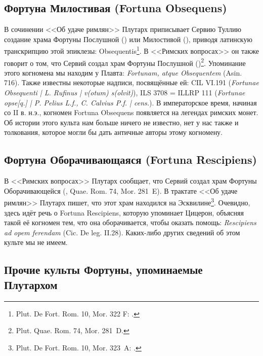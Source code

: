\subsection{Фортуна Милостивая (Fortuna Obsequens)}\label{FortunaObsequens}

В сочинении <<Об удаче римлян>> Плутарх приписывает Сервию Туллию создание храма Фортуны Послушной () или Милостивой (), приводя латинскую транскрипцию этой эпиклезы: Obsequentis\footnote{Plut. De Fort. Rom. 10, Mor. 322 F: .}. В <<Римских вопросах>> он также говорит о том, что Сервий создал храм Фортуны Послушной ()\footnote{Plut. Quae. Rom. 74, Mor. 281~D.}. Упоминание этого когномена мы находим у Плавта: \textit{Fortunam, atque Obsequentem} (Asin. 716). Также известны некоторые надписи, посвящённые ей: CIL VI.191 (\textit{Fortunae Obsequenti |  L. Rufinus | v(otum) s(olvit)}), ILS 3708 = ILLRP 111 (\textit{Fortunae opse[q.] | P. Pelius L.f., C. Calvius P.f. | cens.}). В императорское время, начиная со II в. н.э., когномен Fortuna Obsequens появляется на легендах римских монет. Об истории этого культа нам больше ничего не известно, нет у нас также и толкования, которое могли бы дать античные авторы этому когномену.

\subsection{Фортуна Оборачивающаяся (Fortuna Rescipiens)}\label{FortunaRescipiens}

В <<Римских вопросах>> Плутарх сообщает, что Сервий создал храм Фортуны Оборачивающейся (, Quae. Rom. 74, Mor. 281~E). В трактате <<Об удаче римлян>> Плутарх пишет, что этот храм находился на Эсквилине\footnote{Plut. De Fort. Rom. 10, Mor. 323~A: .}. Очевидно, здесь идёт речь о Fortuna Rescipiens, которую упоминает Цицерон, объясняя такой её когномен тем, что она оборачивается, чтобы оказать помощь: \textit{Rescipiens ad opem ferendam} (Cic. De leg. II.28). Каких-либо других сведений об этом культе мы не имеем.

\subsection{Прочие культы Фортуны, упоминаемые Плутархом}\label{FortunaeVariaePlutarchi}

